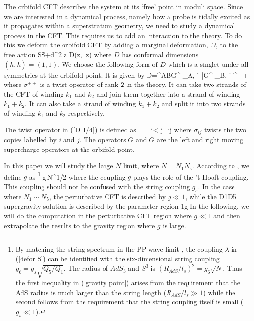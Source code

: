 \documentclass[11pt]{article}
\begin{document}
The orbifold CFT describes the system at its `free' point in moduli space. Since we are interested in a dynamical process, namely how a probe is tidally excited as it propagates within a superstratum geometry, we need to study a dynamical process in the CFT. This requires us to add an interaction to the theory.  To do this we deform the orbifold CFT by adding a marginal deformation, $D$, to the free action \cite{Avery:2010er,Burrington:2014yia,Carson:2016uwf,peet}
\be\label{defor S}
S\r S+\lambda \int d^2 z D(z, \bar z)
\ee
where $D$ has conformal dimensions $(h, \bar h)=(1,1)$. We choose the following form of $D$ which is a singlet under all symmetries at the orbifold point. It is given by
\be\label{D 1/4}
D=\epsilon^{\dot A\dot B}G^{-}_{\dot A, -\h} \bar G^{-}_{\dot B, -\h} \sigma^{++}
\ee
where $\sigma^{++}$ is a twist operator of rank $2$ in the theory. It can take two strands of the CFT of winding $k_1$ and $k_2$ and join them together into a strand of winding $k_1+k_2$. It can also take a strand of winding $k_1+k_2$ and split it into two strands of winding $k_1$ and $k_2$ respectively. 


The twist operator in (\ref{D 1/4}) is defined as
\bea
\sigma = \sum_{i< j}\sigma_{ij}
\eea
where $\sigma_{ij}$ twists the two copies labelled by $i$ and $j$.
The operators $ G$ and $\bar G$ are the left and right moving supercharge operators at the orbifold point. 

In this paper we will study the large $N$ limit, where $N=N_1 N_5$.
According to \cite{Gomis:2002qi,gn}, 
we define $g$ as
\footnote{By matching the string spectrum in the PP-wave limit \cite{gn}, the coupling $\lambda$ in (\ref{defor S}) can be identified with the six-dimensional string coupling $g_6=g_s\sqrt{Q_5/Q_1}$. The radius of $AdS_3$ and $S^3$ is $(R_{AdS}/l_s)^2=g_6 \sqrt{N}$. Thus the first inequality in (\ref{gravity point}) arises from the requirement that the AdS radius is much larger than the string length ($R_{AdS}/l_s\gg 1$) while the second follows from the requirement that the string coupling itself is small ($g_s\ll 1$).}
\bea\label{t coupling}
g\equiv \lambda\,N^{1/2}  
\eea
where the coupling $g$ plays the role of the 't Hooft coupling. This coupling should not be confused with the string coupling $g_s$.
In the case where $N_1\sim N_5$, the perturbative CFT is described by $g\ll 1$, while 
the D1D5 supergravity solution is described by
the parameter region
\be\label{gravity point}
1\ll g \ll {}
\ee
In the following, we will do the computation in the perturbative CFT region where $g\ll 1$ and then extrapolate the results to the gravity region where $g$ is large.
\end{document}

